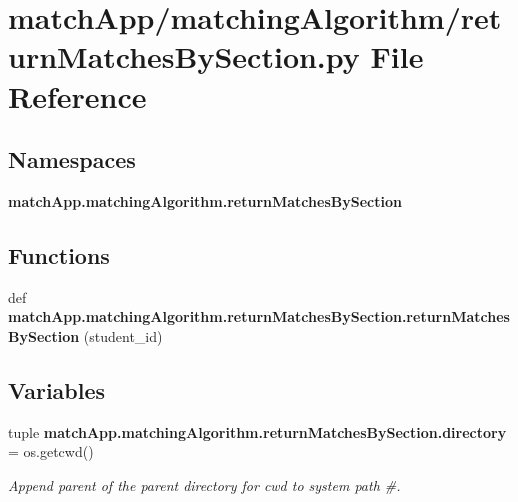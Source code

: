 \section{match\+App/matching\+Algorithm/return\+Matches\+By\+Section.py File Reference}
\label{return_matches_by_section_8py}
\subsection*{Namespaces}
\begin{DoxyCompactItemize}
\item 
 {\bf match\+App.\+matching\+Algorithm.\+return\+Matches\+By\+Section}
\end{DoxyCompactItemize}
\subsection*{Functions}
\begin{DoxyCompactItemize}
\item 
def {\bf match\+App.\+matching\+Algorithm.\+return\+Matches\+By\+Section.\+return\+Matches\+By\+Section} (student\+\_\+id)
\end{DoxyCompactItemize}
\subsection*{Variables}
\begin{DoxyCompactItemize}
\item 
tuple {\bf match\+App.\+matching\+Algorithm.\+return\+Matches\+By\+Section.\+directory} = os.\+getcwd()
\begin{DoxyCompactList}\small\item\em Append parent of the parent directory for cwd to system path \#. \end{DoxyCompactList}\end{DoxyCompactItemize}
